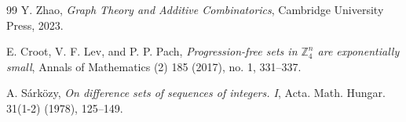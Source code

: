 \documentclass[11pt]{amsart}
\theoremstyle{definition}
\theoremstyle{remark}
\begin{document}
\begin{thebibliography}{99}
Y. Zhao, \emph{Graph Theory and Additive Combinatorics}, Cambridge University Press, 2023. 

E. Croot, V. F. Lev, and P. P. Pach, \emph{Progression-free sets in $\mathbb{Z}_4^n$ are exponentially small}, Annals of Mathematics (2) 185 (2017), no. 1, 331--337. 


A. S\'ark\"ozy, \emph{On difference sets of sequences of integers. I}, Acta. Math. Hungar. 31(1-2) (1978), 125--149.

\end{thebibliography}
\end{document}
